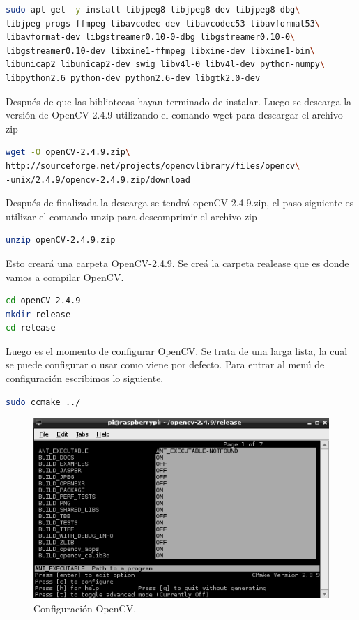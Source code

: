 \documentclass[letterpaper,12pt]{article}
\begin{document}
\begin{lstlisting}[language=bash, frame=single]
sudo apt-get -y install libjpeg8 libjpeg8-dev libjpeg8-dbg\
libjpeg-progs ffmpeg libavcodec-dev libavcodec53 libavformat53\
libavformat-dev libgstreamer0.10-0-dbg libgstreamer0.10-0\
libgstreamer0.10-dev libxine1-ffmpeg libxine-dev libxine1-bin\
libunicap2 libunicap2-dev swig libv4l-0 libv4l-dev python-numpy\
libpython2.6 python-dev python2.6-dev libgtk2.0-dev
\end{lstlisting}
Después de que las bibliotecas hayan terminado de instalar. Luego se descarga la versión de OpenCV 2.4.9 utilizando el comando wget para descargar el archivo zip 
\begin{lstlisting}[language=bash, frame=single]
wget -O openCV-2.4.9.zip\
http://sourceforge.net/projects/opencvlibrary/files/opencv\
-unix/2.4.9/opencv-2.4.9.zip/download
\end{lstlisting}
Después de finalizada la descarga se tendrá openCV-2.4.9.zip, el paso siguiente es utilizar el comando unzip para descomprimir el archivo zip
\begin{lstlisting}[language=bash, frame=single]
unzip openCV-2.4.9.zip 
\end{lstlisting}
Esto creará una carpeta OpenCV-2.4.9. Se creá la carpeta realease que es donde vamos a compilar OpenCV.
\begin{lstlisting}[language=bash, frame=single]
cd openCV-2.4.9
mkdir release
cd release
\end{lstlisting}

Luego es el momento de configurar OpenCV. Se trata de una larga lista, la cual se puede configurar o usar como viene por defecto. Para entrar al menú de configuración escribimos lo siguiente.
\begin{lstlisting}[language=bash] 
sudo ccmake ../ 
\end{lstlisting}

\begin{figure}[H]
\centering
\includegraphics[scale=0.5,keepaspectratio=true]{Figs/Raspy04.png}
\caption{Configuración OpenCV.}
\label{fig:Raspy3}
\end{figure}
\end{document}
